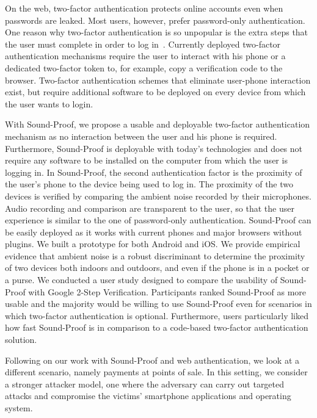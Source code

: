 On the web, two-factor authentication protects online accounts even when
passwords are leaked. Most users, however, prefer password-only authentication.
One reason why two-factor authentication is so unpopular is the extra steps
that the user must complete in order to log
in~\cite{gunson11cs,weir10int,imperi13umsurvey}. Currently deployed two-factor
authentication mechanisms require the user to interact with his phone or a
dedicated two-factor token to, for example, copy a verification code to the
browser. Two-factor authentication schemes that eliminate user-phone
interaction exist, but require additional software to be deployed on every
device from which the user wants to login.

With Sound-Proof, we propose a usable and deployable two-factor authentication
mechanism as no interaction between the user and his phone is required.
Furthermore, Sound-Proof is deployable with today's technologies and does not
require any software to be installed on the computer from which the user is
logging in. In Sound-Proof, the second authentication factor is the proximity
of the user's phone to the device being used to log in. The proximity of the
two devices is verified by comparing the ambient noise recorded by their
microphones. Audio recording and comparison are transparent to the user, so
that the user experience is similar to the one of password-only authentication.
Sound-Proof can be easily deployed as it works with current phones and major
browsers without plugins. We built a prototype for both Android and iOS. We
provide empirical evidence that ambient noise is a robust discriminant to
determine the proximity of two devices both indoors and outdoors, and even if
the phone is in a pocket or a purse. We conducted a user study designed to
compare the usability of Sound-Proof with Google 2-Step Verification.
Participants ranked Sound-Proof as more usable and the majority would be
willing to use Sound-Proof even for scenarios in which two-factor
authentication is optional. Furthermore, users particularly liked how fast
Sound-Proof is in comparison to a code-based two-factor authentication solution.

Following on our work with Sound-Proof and web authentication, we look at a different scenario, namely payments at points of sale. In this setting, we consider a stronger attacker model, one where the adversary can carry
out targeted attacks and compromise the victims' smartphone applications and
operating system.

